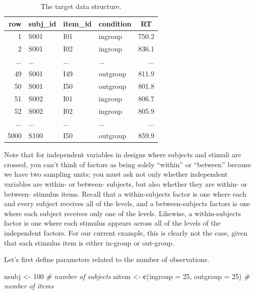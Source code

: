 \documentclass[man,floatsintext]{apa6}
\newenvironment{Shaded}{\begin{snugshade}}{\end{snugshade}}
\newcommand{\KeywordTok}[1]{\textcolor[rgb]{0.13,0.29,0.53}{\textbf{#1}}}
\newcommand{\DataTypeTok}[1]{\textcolor[rgb]{0.13,0.29,0.53}{#1}}
\newcommand{\DecValTok}[1]{\textcolor[rgb]{0.00,0.00,0.81}{#1}}
\newcommand{\StringTok}[1]{\textcolor[rgb]{0.31,0.60,0.02}{#1}}
\newcommand{\CommentTok}[1]{\textcolor[rgb]{0.56,0.35,0.01}{\textit{#1}}}
\newcommand{\NormalTok}[1]{#1}
\begin{document}
\begin{table}[tbp]
\begin{center}
\begin{threeparttable}
\caption{\label{tab:data-example}The target data structure.}
\begin{tabular}{rlllr}
\toprule
row & \multicolumn{1}{c}{subj\_id} & \multicolumn{1}{c}{item\_id} & \multicolumn{1}{c}{condition} & \multicolumn{1}{c}{RT}\\
\midrule
1 & S001 & I01 & ingroup & 750.2\\
2 & S001 & I02 & ingroup & 836.1\\
... & ... & ... & ... & ...\\
49 & S001 & I49 & outgroup & 811.9\\
50 & S001 & I50 & outgroup & 801.8\\
51 & S002 & I01 & ingroup & 806.7\\
52 & S002 & I02 & ingroup & 805.9\\
... & ... & ... & ... & ...\\
5000 & S100 & I50 & outgroup & 859.9\\
\bottomrule
\end{tabular}
\end{threeparttable}
\end{center}
\end{table}

Note that for independent variables in designs where subjects and
stimuli are crossed, you can't think of factors as being solely
\enquote{within} or \enquote{between} because we have two sampling
units; you must ask not only whether independent variables are within-
or between- subjects, but also whether they are within- or between-
stimulus items. Recall that a within-subjects factor is one where each
and every subject receives all of the levels, and a between-subjects
factors is one where each subject receives only one of the levels.
Likewise, a within-subjects factor is one where each stimulus appears
across all of the levels of the independent factors. For our current
example, this is clearly not the case, given that each stimulus item is
either in-group or out-group.

Let's first define parameters related to the number of observations.

\begin{Shaded}
\begin{Highlighting}[]
\NormalTok{nsubj  <-}\StringTok{ }\DecValTok{100} \CommentTok{# number of subjects}
\NormalTok{nitem  <-}\StringTok{ }\KeywordTok{c}\NormalTok{(}\DataTypeTok{ingroup =} \DecValTok{25}\NormalTok{, }\DataTypeTok{outgroup =} \DecValTok{25}\NormalTok{)  }\CommentTok{# number of items}
\end{Highlighting}
\end{Shaded}
\end{document}
